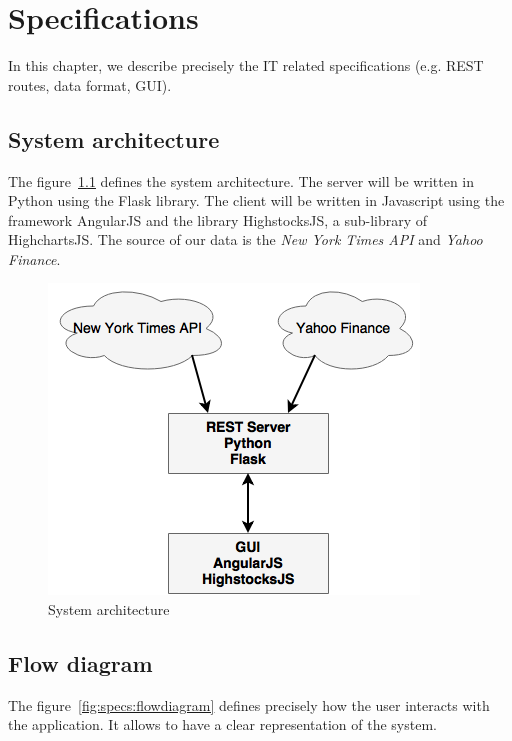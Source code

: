 \chapter{Specifications}
\label{chapter:specifications}
In this chapter, we describe precisely the IT related specifications (e.g. REST routes, data format, GUI).

\section{System architecture}
The figure~\ref{fig:specs:architecture} defines the system architecture. The server will be written in Python using the Flask library. The client will be written in Javascript using the framework AngularJS and the library HighstocksJS, a sub-library of HighchartsJS. The source of our data is the \textit{New York Times API} and \textit{Yahoo Finance}.

\begin{figure}[H]
    \centering
    \includegraphics[scale=0.6]{Figures/st-system-architecture.png}
    \caption{System architecture}
    \label{fig:specs:architecture}
\end{figure}

\section{Flow diagram}
The figure~\ref{fig:specs:flowdiagram} defines precisely how the user interacts with the application. It allows to have a clear representation of the system.

